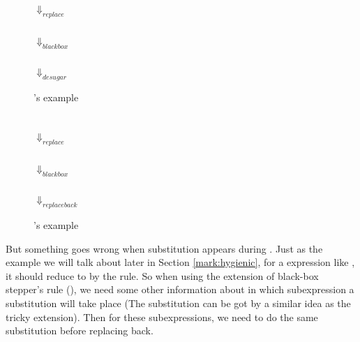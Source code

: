 \begin{center}
\begin{figure}[thb]
\centering
{}\\ $\Downarrow_{replace}$\\ \\ $\Downarrow_{blackbox}$\\ \\ $\Downarrow_{desugar}$\\ 
\caption{'s example}
\label{fig:e1}
\end{figure}

\begin{figure}[thb]
\centering
{}\\ $\Downarrow_{replace}$ \\\\ $\Downarrow_{blackbox}$\\  \\ $\Downarrow_{replaceback}$\\ 
\caption{'s example}
\label{fig:e2}
\end{figure}


\end{center}

But something goes wrong when substitution appears during . Just as the example we will talk about later in Section \ref{mark:hygienic}, for a expression like , it should reduce to  by the  rule. So when using the extension of black-box stepper's rule (), we need some other information about in which subexpression a substitution will take place (The substitution can be got by a similar idea as the tricky extension). Then for these subexpressions, we need to do the same substitution before replacing back. 



